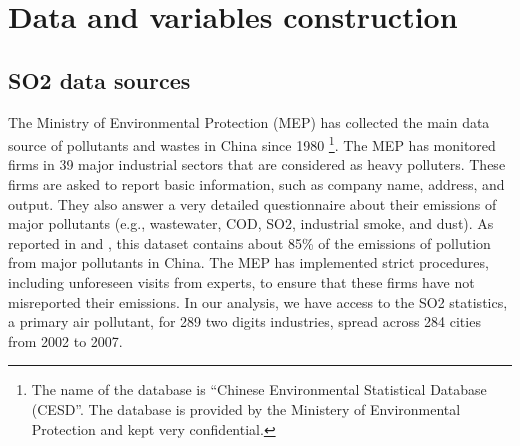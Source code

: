 \documentclass[12pt]{article}
\begin{document}
\section{Data and variables construction} \label{sec:Data}

\subsection{SO2 data sources} \label{sec:so2}

The Ministry of Environmental Protection (MEP) has collected the main data source of pollutants and wastes in China since 1980 \footnote{The name of the database is “Chinese Environmental Statistical Database (CESD”. The database is provided by the Ministery of Environmental Protection and kept very confidential.}. The MEP has monitored firms in 39 major industrial sectors that are considered as heavy polluters. These firms are asked to report basic information, such as company name, address, and output. They also answer a very detailed questionnaire about their emissions of major pollutants (e.g., wastewater, COD, SO2, industrial smoke, and dust). As reported in \cite{Wu2017-bl} and \cite{Jiang2014-pf}, this dataset contains about 85\% of the emissions of pollution from major pollutants in China. The MEP has implemented strict procedures, including unforeseen visits from experts, to ensure that these firms have not misreported their emissions. In our analysis, we have access to the SO2 statistics, a primary air pollutant, for 289 two digits industries, spread across 284 cities from 2002 to 2007.
\end{document}

